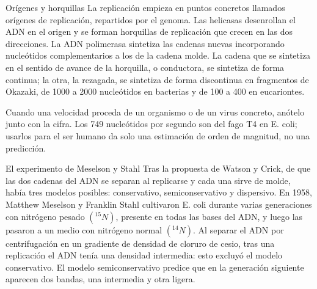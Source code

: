 \documentclass{book}
\begin{document}

\begin{tcolorbox}[title={Consejo}, studiumtip, breakable]

Orígenes y horquillas
La replicación empieza en puntos concretos llamados orígenes de replicación, repartidos por el genoma. Las helicasas desenrollan el ADN en el origen y se forman horquillas de replicación que crecen en las dos direcciones. La ADN polimerasa sintetiza las cadenas nuevas incorporando nucleótidos complementarios a los de la cadena molde. La cadena que se sintetiza en el sentido de avance de la horquilla, o conductora, se sintetiza de forma continua; la otra, la rezagada, se sintetiza de forma discontinua en fragmentos de Okazaki, de 1000 a 2000 nucleótidos en bacterias y de 100 a 400 en eucariontes.


Cuando una velocidad proceda de un organismo o de un virus concreto, anótelo junto con la cifra. Los 749 nucleótidos por segundo son del fago T4 en E. coli; usarlos para el ser humano da solo una estimación de orden de magnitud, no una predicción.

\end{tcolorbox}

\begin{tcolorbox}[title={Definición}, studiumdef, breakable]

El experimento de Meselson y Stahl
Tras la propuesta de Watson y Crick, de que las dos cadenas del ADN se separan al replicarse y cada una sirve de molde, había tres modelos posibles: conservativo, semiconservativo y dispersivo. En 1958, Matthew Meselson y Franklin Stahl cultivaron E. coli durante varias generaciones con nitrógeno pesado \(({}^{15}N)\), presente en todas las bases del ADN, y luego las pasaron a un medio con nitrógeno normal \(({}^{14}N)\). Al separar el ADN por centrifugación en un gradiente de densidad de cloruro de cesio, tras una replicación el ADN tenía una densidad intermedia: esto excluyó el modelo conservativo. El modelo semiconservativo predice que en la generación siguiente aparecen dos bandas, una intermedia y otra ligera.

\end{tcolorbox}
\end{document}
